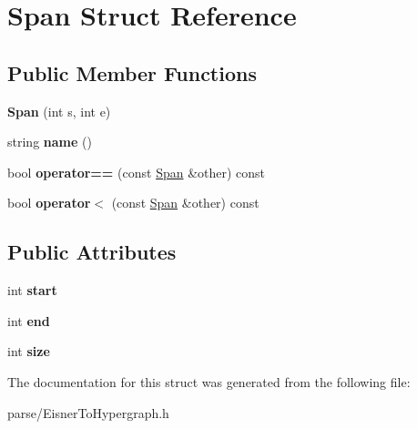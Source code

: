 \hypertarget{struct_span}{
\section{Span Struct Reference}
\label{struct_span}
}
\subsection*{Public Member Functions}
\begin{DoxyCompactItemize}
\item 
\hypertarget{struct_span_aa5fb6e25d5c38cd540cc82ca179c82f2}{
{\bfseries Span} (int s, int e)}
\label{struct_span_aa5fb6e25d5c38cd540cc82ca179c82f2}

\item 
\hypertarget{struct_span_af6e7cf8f52e52996cf52bd7d702e9744}{
string {\bfseries name} ()}
\label{struct_span_af6e7cf8f52e52996cf52bd7d702e9744}

\item 
\hypertarget{struct_span_acebe6ab7baeb922c9c69aac317bbcb7a}{
bool {\bfseries operator==} (const \hyperlink{struct_span}{Span} \&other) const }
\label{struct_span_acebe6ab7baeb922c9c69aac317bbcb7a}

\item 
\hypertarget{struct_span_a413ed85231167a494dafeaea71fb4ae0}{
bool {\bfseries operator$<$} (const \hyperlink{struct_span}{Span} \&other) const }
\label{struct_span_a413ed85231167a494dafeaea71fb4ae0}

\end{DoxyCompactItemize}
\subsection*{Public Attributes}
\begin{DoxyCompactItemize}
\item 
\hypertarget{struct_span_a383594a5e203891204e7fa5849b48e78}{
int {\bfseries start}}
\label{struct_span_a383594a5e203891204e7fa5849b48e78}

\item 
\hypertarget{struct_span_ab1d7ba41653ccb2e46cf061c4a476f1d}{
int {\bfseries end}}
\label{struct_span_ab1d7ba41653ccb2e46cf061c4a476f1d}

\item 
\hypertarget{struct_span_a8637010e702d0acf63cdf790ad49c83e}{
int {\bfseries size}}
\label{struct_span_a8637010e702d0acf63cdf790ad49c83e}

\end{DoxyCompactItemize}


The documentation for this struct was generated from the following file:\begin{DoxyCompactItemize}
\item 
parse/EisnerToHypergraph.h\end{DoxyCompactItemize}
